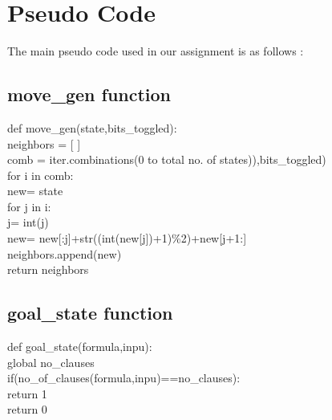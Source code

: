 \documentclass{article}
\begin{document}
\section{Pseudo Code}
The main pseudo code used in our assignment is as follows :
\subsection*{move\_gen function}
\vspace{5pt}
def move\_gen(state,bits\_toggled):
\vspace{5pt}
    \vspace{2pt}
    \\ \hspace*{20pt}neighbors = [ ]
    \vspace{2pt}
    \\ \hspace*{20pt}comb = iter.combinations(0 to total no. of states)),bits\_toggled)
    \vspace{2pt}
    \\ \hspace*{20pt}for i in comb:
    \vspace{2pt}
    \\ \hspace*{30pt}new= state
    \vspace{2pt}
    \\ \hspace*{30pt}for j in i:
    \vspace{2pt}
    \\ \hspace*{40pt}j= int(j)
    \vspace{2pt}
    \\ \hspace*{40pt}new= new[:j]+str((int(new[j])+1)\%2)+new[j+1:]
    \vspace{2pt}
    \\ \hspace*{70pt}neighbors.append(new)
    \vspace{2pt}
    \\ \hspace*{20pt}return neighbors

\subsection*{goal\_state function}
    \vspace{5pt}
    def goal\_state(formula,inpu):
        \vspace{5pt}
        \\ \hspace*{20pt}global no\_clauses
        \vspace{5pt}
        \\ \hspace*{20pt}if(no\_of\_clauses(formula,inpu)==no\_clauses):
        \vspace{5pt}
        \\ \hspace*{30pt} return 1
        \vspace{5pt}
        \\ \hspace*{20pt} return 0
\newpage
\end{document}
